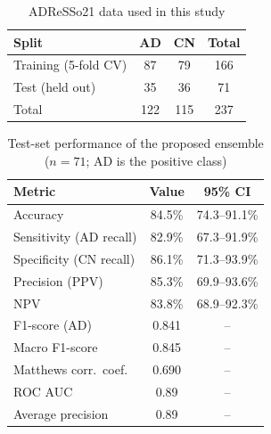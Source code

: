 %


\begin{table}[!t]
\centering
\caption{ADReSSo21 data used in this study}
\label{tab:dataset}
\begin{tabular}{lccc}
\toprule
Split & AD & CN & Total \\
\midrule
Training (5-fold CV) & 87 & 79 & 166 \\
Test (held out)      & 35 & 36 & 71  \\
\midrule
Total                & 122 & 115 & 237 \\
\bottomrule
\end{tabular}
\end{table}


\begin{table}[!t]
\centering
\caption{Test-set performance of the proposed ensemble ($n=71$; AD is the positive class)}
\label{tab:metrics}
\begin{tabular}{lcc}
\toprule
Metric & Value & 95\% CI \\
\midrule
Accuracy                  & 84.5\% & 74.3--91.1\% \\
Sensitivity (AD recall)   & 82.9\% & 67.3--91.9\% \\
Specificity (CN recall)   & 86.1\% & 71.3--93.9\% \\
Precision (PPV)           & 85.3\% & 69.9--93.6\% \\
NPV                       & 83.8\% & 68.9--92.3\% \\
\midrule
F1-score (AD)             & 0.841 & -- \\
Macro F1-score            & 0.845 & -- \\
Matthews corr.\ coef.     & 0.690 & -- \\
ROC AUC                   & 0.89  & -- \\
Average precision         & 0.89  & -- \\
\bottomrule
\end{tabular}
\end{table}


